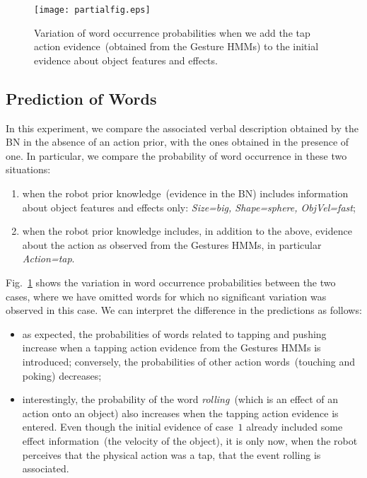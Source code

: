 \begin{figure}
\centering
\texttt{[image: partialfig.eps]}
\caption{Variation of word occurrence probabilities when we add the tap action evidence~(obtained from the Gesture \acp{HMM}) to the initial evidence about object features and effects.}
\label{fig:probdiff}
\end{figure}

\subsection{Prediction of Words}

In this experiment, we compare the associated verbal description obtained by the \acl{BN} in the absence of an action prior, with the ones obtained in the presence of one. In particular, we compare the probability of word occurrence in these two situations:
\begin{enumerate}
\item when the robot prior knowledge~(evidence in the \ac{BN}) includes information about object features and effects only: \emph{Size=big, Shape=sphere, ObjVel=fast};

\item when the robot prior knowledge includes, in addition to the above, evidence about the action as observed from the Gestures \acp{HMM}, in particular \emph{Action=tap}.
\end{enumerate}

Fig.~\ref{fig:probdiff} shows the variation in word occurrence probabilities between the two cases, where we have omitted words for which no significant variation was observed in this case. We can interpret the difference in the predictions as follows:
\begin{itemize}
\item as expected, the probabilities of words related to tapping and pushing increase when a tapping action evidence from the Gestures \acp{HMM} is introduced; conversely, the probabilities of other action words~(touching and poking) decreases;

\item interestingly, the probability of the word \emph{rolling}~(which is an effect of an action onto an object) also increases when the tapping action evidence is entered. Even though the initial evidence of case~$1$ already included some effect information~(the velocity of the object), it is only now, when the robot perceives that the physical action was a tap, that the event rolling is associated.
\end{itemize}


